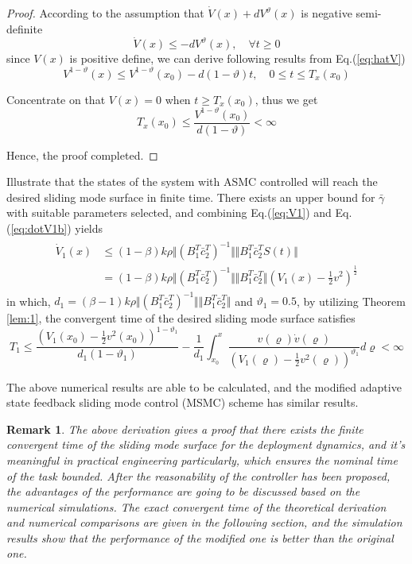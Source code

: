 \documentclass[3p]{elsarticle}
\theoremstyle{plain}
\newtheorem{myrem}{Remark}
\begin{document}
\begin{proof}
According to the assumption that $\dot{V}(x)+dV^{\vartheta}(x)$ is negative semi-definite
\begin{equation}
\dot{V}(x)\le-dV^\vartheta(x), \quad\forall t\ge 0 \label{eq:hatV}
\end{equation}
since $V(x)$ is positive define, we can derive following results from Eq.(\ref{eq:hatV})
\begin{equation*}
V^{1-\vartheta}(x)\le V^{1-\vartheta}(x_0)-d(1-\vartheta)t,\quad 0\le t\le T_x(x_0)
\end{equation*}\par
Concentrate on that $V(x)=0$ when $t\ge T_x(x_0)$, thus we get
\begin{equation*}
T_x(x_0)\le\frac{V^{1-\vartheta}(x_0)}{d(1-\vartheta)}<\infty
\end{equation*}\par
Hence, the proof completed.
\end{proof}
Illustrate that the states of the system with ASMC controlled will reach the desired sliding mode surface in finite time. There exists an upper bound for $\bar{\gamma}$ with suitable parameters selected, and combining Eq.(\ref{eq:V1}) and Eq.(\ref{eq:dotV1b}) yields
\begin{align}
\begin{split}
\dot{V}_1(x) &\le (1 -\beta)k\rho\Vert(B_1^T\bar{c}^T_2)^{-1}\Vert \Vert B^T_1\bar{c}_2^TS(t)\Vert\\
&=(1 -\beta)k\rho\Vert(B_1^T\bar{c}^T_2)^{-1}\Vert \Vert B^T_1\bar{c}_2^T\Vert (V_1(x)-\frac{1}{2}v^2)^{\frac{1}{2}}
\end{split}
\end{align}
in which, $d_1 = (\beta-1)k\rho\Vert(B_1^T\bar{c}^T_2)^{-1}\Vert \Vert B^T_1\bar{c}_2^T\Vert$ and $\vartheta_1 = 0.5$, by utilizing Theorem \ref{lem:1}, the convergent time of the desired sliding mode surface satisfies
\begin{equation}
T_1 \le \frac{(V_1(x_0)-\frac{1}{2}v^2(x_0))^{1-\vartheta_1}}{d_1(1-\vartheta_1)}-\frac{1}{d_1}\int_{x_0}^x\frac{v(\varrho)\dot v(\varrho)}{(V_1(\varrho)-\frac{1}{2}v^2(\varrho))^{\vartheta_1}}d\varrho<\infty
\end{equation}\par
The above numerical results are able to be calculated, and the modified adaptive state feedback sliding mode control (MSMC) scheme has similar results.
\begin{myrem}
The above derivation gives a proof that there exists the finite convergent time of the sliding mode surface for the deployment dynamics, and it's meaningful in practical engineering particularly, which ensures the nominal time of the task bounded. After the reasonability of the controller has been proposed, the advantages of the performance are going to be discussed based on the numerical simulations. The exact convergent time of the theoretical derivation and numerical comparisons are given in the following section, and the simulation results show that the performance of the modified one is better than the original one.
\end{myrem}
\end{document}

